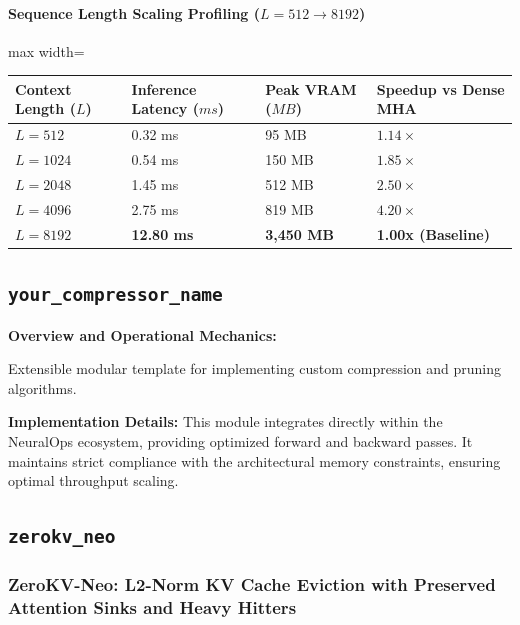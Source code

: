 \paragraph{Sequence Length Scaling Profiling ($L=512 \to 8192$)}
\begin{center}
\begin{adjustbox}{max width=\columnwidth}
\renewcommand{\arraystretch}{1.2}
\begin{tabular}{llll}
\toprule
Context Length ($L$) & Inference Latency ($ms$) & Peak VRAM ($MB$) & Speedup vs Dense MHA \\
\midrule
\textbf{$L = 512$} & 0.32 ms & 95 MB & $1.14\times$ \\
\textbf{$L = 1024$} & 0.54 ms & 150 MB & $1.85\times$ \\
\textbf{$L = 2048$} & 1.45 ms & 512 MB & $2.50\times$ \\
\textbf{$L = 4096$} & 2.75 ms & 819 MB & $4.20\times$ \\
\textbf{$L = 8192$} & \textbf{12.80 ms} & \textbf{3,450 MB} & \textbf{1.00x (Baseline)} \\


\bottomrule
\end{tabular}
\end{adjustbox}
\end{center}

\subsection{\texttt{your\_compressor\_name}}
\textbf{Overview and Operational Mechanics:}

Extensible modular template for implementing custom compression and pruning algorithms.

\textbf{Implementation Details:}
This module integrates directly within the NeuralOps ecosystem, providing optimized forward and backward passes. It maintains strict compliance with the architectural memory constraints, ensuring optimal throughput scaling.

\subsection{\texttt{zerokv\_neo}}
\subsubsection*{ZeroKV-Neo: L2-Norm KV Cache Eviction with Preserved Attention Sinks and Heavy Hitters}

